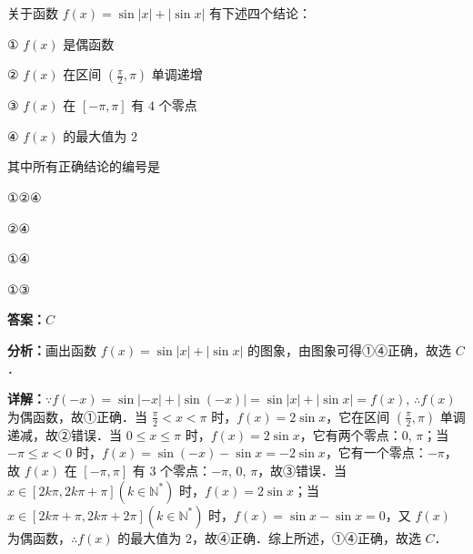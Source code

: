 \begin{question}[points=5]
关于函数 $f(x) = \sin|x| + |\sin x|$ 有下述四个结论：

① $f(x)$ 是偶函数

② $f(x)$ 在区间 $\left(\frac{\pi}{2}, \pi\right)$ 单调递增

③ $f(x)$ 在 $[-\pi, \pi]$ 有 $4$ 个零点

④ $f(x)$ 的最大值为 $2$

其中所有正确结论的编号是
\begin{choices}
  \item ①②④
  \item ②④
  \item ①④
  \item ①③
\end{choices}
\begin{solution}
\textbf{答案：}$C$

\textbf{分析：}画出函数 $f(x) = \sin|x| + |\sin x|$ 的图象，由图象可得①④正确，故选 $C$．

\textbf{详解：}$\because f(-x) = \sin|-x| + |\sin(-x)| = \sin|x| + |\sin x| = f(x)$, $\therefore f(x)$ 为偶函数，故①正确．当 $\frac{\pi}{2} < x < \pi$ 时，$f(x) = 2\sin x$，它在区间 $\left(\frac{\pi}{2}, \pi\right)$ 单调递减，故②错误．当 $0 \le x \le \pi$ 时，$f(x) = 2\sin x$，它有两个零点：$0$, $\pi$；当 $-\pi \le x < 0$ 时，$f(x) = \sin(-x) - \sin x = -2\sin x$，它有一个零点：$-\pi$，故 $f(x)$ 在 $[-\pi, \pi]$ 有 $3$ 个零点：$-\pi$, $0$, $\pi$，故③错误．当 $x \in [2k\pi, 2k\pi + \pi] (k \in \mathbb{N}^*)$ 时，$f(x) = 2\sin x$；当 $x \in [2k\pi + \pi, 2k\pi + 2\pi] (k \in \mathbb{N}^*)$ 时，$f(x) = \sin x - \sin x = 0$，又 $f(x)$ 为偶函数，$\therefore f(x)$ 的最大值为 $2$，故④正确．综上所述，①④正确，故选 $C$．
\end{solution}
\end{question}

